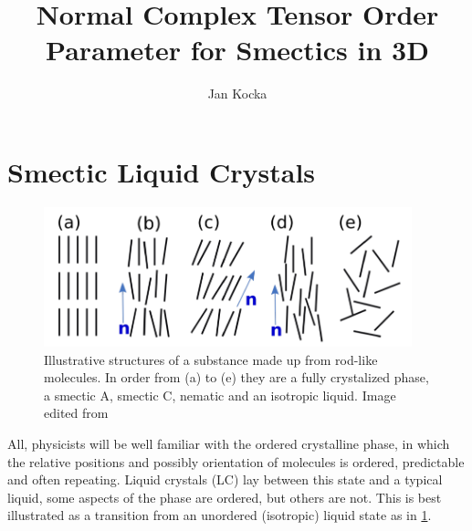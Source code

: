 \documentclass[12pt]{article}
\begin{document}
\title{Normal Complex Tensor Order Parameter for Smectics in 3D}
\author{Jan Kocka}

\begin{abstract}
    \lipsum[10]
\end{abstract}

\maketitle

\personalstatement
\acknowledgments

\maintext

\section{Smectic Liquid Crystals}
    \begin{figure}[t]
        \begin{center}
            \includegraphics[width=0.95\textwidth]{figures/phases.pdf}
        \end{center}
        \caption{
            Illustrative structures of a substance made up from rod-like molecules.
            In order from (a) to (e) they are a fully crystalized phase, a smectic A, smectic C, nematic and an isotropic liquid.
            Image edited from
        }\label{fig:phases}
    \end{figure}
    All, physicists will be well familiar with the ordered crystalline phase, in which the relative positions and possibly orientation of molecules is ordered, predictable and often repeating.
    Liquid crystals (LC) lay between this state and a typical liquid, some aspects of the phase are ordered, but others are not.
    This is best illustrated as a transition from an unordered (isotropic) liquid state as in \cref{fig:phases}.
\end{document}
